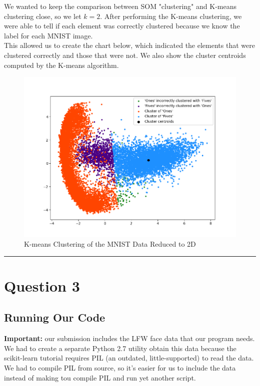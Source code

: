 \documentclass[11pt]{article}
\begin{document}
We wanted to keep the comparison between SOM "clustering" and K-means
clustering close, so we let \(k = 2\). After performing the K-means
clustering, we were able to tell if each element was correctly clustered
because we know the label for each MNIST image.
\\

This allowed us to
create the chart below, which indicated the elements that were clustered
correctly and those that were not. We also show the cluster centroids
computed by the K-means algorithm.

\begin{figure}[h!]
	\centering
	\includegraphics[scale=0.9]{../figures/q2/kmeans-clustering-small-dots.png}
	\caption{K-means Clustering of the MNIST Data Reduced to 2D}
\end{figure}

 \begin{center}\rule{0.5\linewidth}{\linethickness}\end{center}

\pagebreak


\section{Question 3}\label{question-3}

\subsection{Running Our Code}\label{running-our-code}

\textbf{Important:} our submission includes the LFW face data that our
program needs. We had to create a separate Python 2.7 utility obtain
this data because the scikit-learn tutorial requires PIL (an outdated,
little-supported) to read the data. We had to compile PIL from source,
so it's easier for us to include the data instead of making tou compile
PIL and run yet another script.
\\
\end{document}
